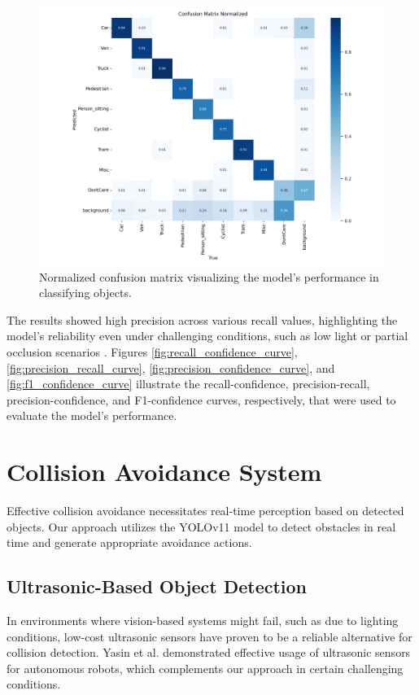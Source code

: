 \documentclass[12pt]{article}
\begin{document}
\begin{figure}[h]
    \centering
    \includegraphics[width=\textwidth]{images/confusion_matrix_normalized.png}
    \caption{Normalized confusion matrix visualizing the model's performance in classifying objects.}
    \label{fig:confusion_matrix}
\end{figure}

The results showed high precision across various recall values, highlighting the model's reliability even under challenging conditions, such as low light or partial occlusion scenarios \cite{eppenberger2020leveraging}. Figures \ref{fig:recall_confidence_curve}, \ref{fig:precision_recall_curve}, \ref{fig:precision_confidence_curve}, and \ref{fig:f1_confidence_curve} illustrate the recall-confidence, precision-recall, precision-confidence, and F1-confidence curves, respectively, that were used to evaluate the model's performance.

\section{Collision Avoidance System}

Effective collision avoidance necessitates real-time perception based on detected objects. Our approach utilizes the YOLOv11 model to detect obstacles in real time and generate appropriate avoidance actions.

\subsection{Ultrasonic-Based Object Detection}
In environments where vision-based systems might fail, such as due to lighting conditions, low-cost ultrasonic sensors have proven to be a reliable alternative for collision detection. Yasin et al. \cite{yasin2020low} demonstrated effective usage of ultrasonic sensors for autonomous robots, which complements our approach in certain challenging conditions.
\end{document}

